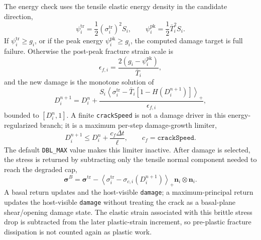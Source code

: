 The energy check uses the tensile elastic energy density in the candidate direction,
\begin{equation}
  \psi_i^{\mathrm{tr}}=\frac{1}{2}\left(\sigma_i^{\mathrm{tr}}\right)^2S_i,
  \qquad
  \psi_i^{\mathrm{pk}}=\frac{1}{2}\bar T_i^2S_i.
  \label{eq:graphite-brittle-energy}
\end{equation}
If \(\psi_i^{\mathrm{tr}}\ge g_i\), or if the peak energy \(\psi_i^{\mathrm{pk}}\ge g_i\), the computed damage target is full failure.  Otherwise the post-peak fracture strain scale is
\begin{equation}
  \epsilon_{f,i}=\frac{2\left(g_i-\psi_i^{\mathrm{pk}}\right)}{\bar T_i},
  \label{eq:graphite-brittle-softening-strain}
\end{equation}
and the new damage is the monotone solution of
\begin{equation}
  D_i^{n+1}=D_i^n+
  \frac{S_i\left\langle\sigma_i^{\mathrm{tr}}-\bar T_i\left[1-H(D_i^{n+1})\right]\right\rangle_+}{\epsilon_{f,i}},
  \label{eq:graphite-brittle-damage-update}
\end{equation}
bounded to \([D_i^n,1]\).  A finite \texttt{crackSpeed} is not a damage driver in this energy-regularized branch; it is a maximum per-step damage-growth limiter,
\begin{equation}
  D_i^{n+1}\le D_i^n + \frac{c_f\Delta t}{\ell},
  \qquad c_f=\texttt{crackSpeed}.
  \label{eq:graphite-crackspeed-limiter}
\end{equation}
The default \texttt{DBL\_MAX} value makes this limiter inactive.  After damage is selected, the stress is returned by subtracting only the tensile normal component needed to reach the degraded cap,
\begin{equation}
  \boldsymbol{\sigma}^{B} = \boldsymbol{\sigma}^{\mathrm{tr}}
  -\left\langle \sigma_i^{\mathrm{tr}}-\sigma_{c,i}(D_i^{n+1})\right\rangle_+
  \mathbf n_i\otimes\mathbf n_i.
  \label{eq:graphite-brittle-stress-return}
\end{equation}
A basal return updates  and the host-visible \texttt{damage}; a maximum-principal return updates the host-visible \texttt{damage} without treating the crack as a basal-plane shear/opening damage state.  The elastic strain associated with this brittle stress drop is subtracted from the later plastic-strain increment, so pre-plastic fracture dissipation is not counted again as plastic work.

